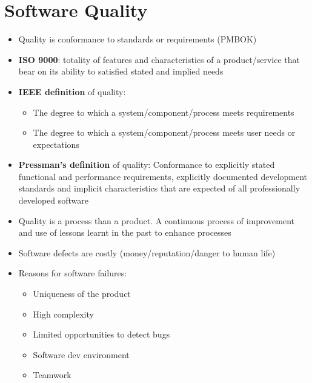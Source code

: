 \documentclass{article}
\begin{document}
\section{Software Quality}
\begin{itemize}
    \item Quality is conformance to standards or requirements (PMBOK)
    
    \item \textbf{ISO 9000}: totality of features and characteristics of a product/service that bear on its ability to satisfied stated and implied needs
    
    \item \textbf{IEEE definition} of quality: 
    \begin{itemize}
        \item The degree to which a system/component/process meets requirements
        
        \item The degree to which a system/component/process meets user needs or expectations
    \end{itemize}
    
    \item \textbf{Pressman's definition} of quality: Conformance to explicitly stated functional and performance requirements, explicitly documented development standards and implicit characteristics that are expected of all professionally developed software
    
    \item Quality is a process than a product. A continuous process of improvement and use of lessons learnt in the past to enhance processes
    
    \item Software defects are costly (money/reputation/danger to human life)
    
    \item Reasons for software failures:
    \begin{itemize}
        \item Uniqueness of the product
        
        \item High complexity
        
        \item Limited opportunities to detect bugs
        
        \item Software dev environment
        
        \item Teamwork
    \end{itemize}
\end{itemize}
\end{document}

